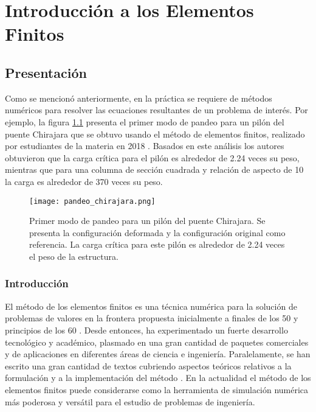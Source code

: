 %
\chapter{Introducción a los Elementos Finitos}
\graphicspath{{img/FEM/}}

\section{Presentación}

Como se mencionó anteriormente, en la práctica se requiere de métodos numéricos
para resolver las ecuaciones resultantes de un problema de interés. Por ejemplo,
la figura \ref{fig:chirajara} presenta el primer modo de pandeo para un pilón 
del puente Chirajara que se obtuvo usando el método de elementos finitos, 
realizado por estudiantes de la materia en 2018 \cite{pandeo_chirajara}. Basados
en este análisis los autores obtuvieron que la carga  crítica para el pilón
es alrededor de 2.24 veces su peso, mientras que para una columna de sección 
cuadrada y relación de aspecto de 10 la carga es alrededor de 370 veces su peso.
\begin{figure}[h]
    \centering
    \texttt{[image: pandeo\_chirajara.png]}
    \caption{Primer modo de pandeo para un pilón del puente Chirajara. Se 
    presenta la configuración deformada y la configuración original como 
    referencia. La carga crítica para este pilón es alrededor de 2.24 veces
    el peso de la estructura.}
    \label{fig:chirajara}
\end{figure}

\subsection{Introducción}

El método de los elementos finitos es una técnica numérica para la solución de 
problemas de valores en la frontera propuesta inicialmente a finales de los 50 
y principios de los 60  \cite{clough65, turner56}. Desde entonces, ha 
experimentado un fuerte desarrollo tecnológico y académico, plasmado en una 
gran cantidad de paquetes comerciales y de aplicaciones en diferentes áreas de 
ciencia e ingeniería. Paralelamente, se han escrito una gran cantidad de textos 
cubriendo aspectos teóricos relativos a la formulación y a la implementación 
del método \cite{book:bathe, book:hughes,  book:reddy, book:zienkiewicz}. En la 
actualidad el método de los elementos finitos puede considerarse como la 
herramienta de simulación numérica más poderosa y versátil para el estudio de 
problemas de ingeniería. 

